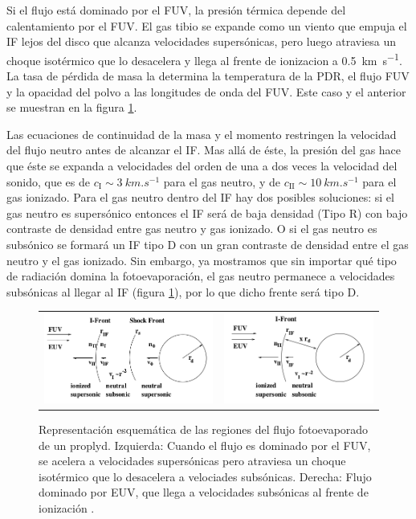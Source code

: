 Si el flujo está dominado por el FUV, la presión térmica depende del calentamiento por el FUV. El gas tibio se expande como un viento que empuja el IF lejos del disco que alcanza velocidades supersónicas, pero luego atraviesa un choque isotérmico que lo desacelera y llega al frente de ionizacion a \SI{0.5}{km.s^{-1}}. La tasa de pérdida de masa la determina la temperatura de la PDR, el flujo FUV y la opacidad del polvo a las longitudes de onda del FUV. Este caso y el anterior se muestran en la figura \ref{fig:EUV-FUV-IF}.

Las ecuaciones de continuidad de la masa y el momento restringen la velocidad del flujo neutro antes de alcanzar el IF. Mas allá de éste, la presión del gas hace que éste se expanda a velocidades del orden de una a dos veces la velocidad del sonido, que es de $c_{\mathrm{I}} \sim \SI{3}{km.s^{-1}}$ para el gas neutro, y de $c_{\mathrm{II}} \sim \SI{10}{km.s^{-1}}$ para el gas ionizado. Para el gas neutro dentro del IF hay dos posibles soluciones: si el gas neutro es supersónico entonces el IF será de baja densidad (Tipo R) con bajo contraste de densidad entre gas neutro y gas ionizado. O si el gas neutro es subsónico se formará un IF tipo D con un gran contraste de densidad entre el gas neutro y el gas ionizado. Sin embargo, ya mostramos que sin importar qué tipo de radiación domina la fotoevaporación, el gas neutro permanece a velocidades subsónicas al llegar al IF (figura \ref{fig:EUV-FUV-IF}), por lo que dicho frente será tipo D.

\begin{figure}
  \centering
    \begin{tabular}{cc}
      \includegraphics[width=0.5\linewidth]{./Figures/Johnstone-2} &
      \includegraphics[width=0.5\linewidth]{./Figures/Johnstone-3}
    \end{tabular}
    \caption{Representación esquemática de las regiones del flujo fotoevaporado de un proplyd. Izquierda: Cuando el flujo es dominado por el FUV, se acelera a velocidades supersónicas pero atraviesa un choque isotérmico que lo desacelera a velociades subsónicas. Derecha: Flujo dominado por EUV, que llega a velocidades subsónicas al frente de ionización \citep{Johnstone:1998}.}
    \label{fig:EUV-FUV-IF}
  \end{figure}
  
